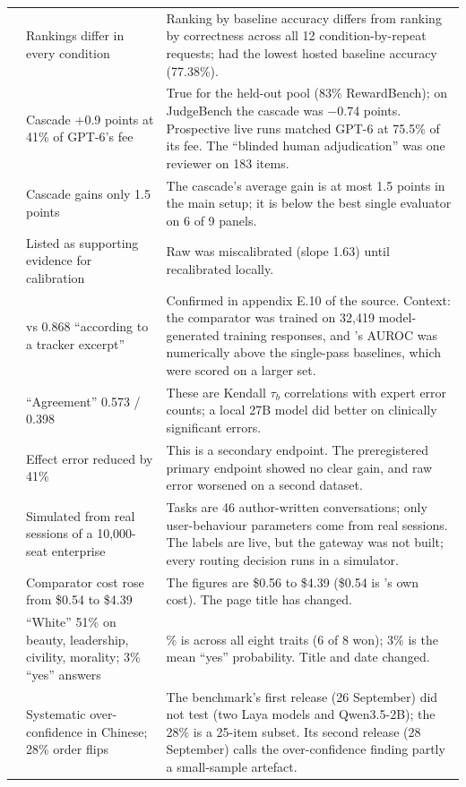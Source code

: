 {\begin{longtable}{@{}>{\raggedright\arraybackslash}p{1.5cm}>{\raggedright\arraybackslash}p{5.6cm}>{\raggedright\arraybackslash}p{8.4cm}@{}}
\cite{arx27678} & Rankings differ in every condition & Ranking by baseline accuracy differs from ranking by correctness across all 12 condition-by-repeat requests; \jev{} had the lowest hosted baseline accuracy (77.38\%). \\
\cite{arx26550} & Cascade +0.9 points at 41\% of GPT-6's fee & True for the held-out pool (83\% RewardBench); on JudgeBench the cascade was $-$0.74 points. Prospective live runs matched GPT-6 at 75.5\% of its fee. The ``blinded human adjudication'' was one reviewer on 183 items. \\
\cite{arx29769} & Cascade gains only 1.5 points & The cascade's average gain is at most 1.5 points in the main setup; it is below the best single evaluator on 6 of 9 panels. \\
\cite{arx24052} & Listed as supporting evidence for calibration & Raw \jev{} was miscalibrated (slope 1.63) until recalibrated locally. \\
\cite{arx24881} & 0.666 vs 0.868 ``according to a tracker excerpt'' & Confirmed in appendix E.10 of the source. Context: the comparator was trained on 32,419 model-generated training responses, and \jev{}'s AUROC was numerically above the single-pass baselines, which were scored on a larger set. \\
\cite{arx27607} & ``Agreement'' 0.573 / 0.398 & These are Kendall $\tau_b$ correlations with expert error counts; a local 27B model did better on clinically significant errors. \\
\cite{arx27535} & Effect error reduced by 41\% & This is a secondary endpoint. The preregistered primary endpoint showed no clear gain, and raw error worsened on a second dataset. \\
\cite{arx28919} & Simulated from real sessions of a 10,000-seat enterprise & Tasks are 46 author-written conversations; only user-behaviour parameters come from real sessions. The \jev{} labels are live, but the gateway was not built; every routing decision runs in a simulator. \\
\cite{checkpoint2026jev} & Comparator cost rose from \$0.54 to \$4.39 & The figures are \$0.56 to \$4.39 (\$0.54 is \jev{}'s own cost). The page title has changed. \\
\cite{simmons2026saidno} & ``White'' 51\% on beauty, leadership, civility, morality; 3\% ``yes'' answers & 51\% is across all eight traits (6 of 8 won); 3\% is the mean ``yes'' probability. Title and date changed. \\
\cite{qin2026zhdecisionbench} & Systematic over-confidence in Chinese; 28\% order flips & The benchmark's first release (26 September) did not test \jev{} (two Laya models and Qwen3.5-2B); the 28\% is a 25-item subset. Its second release (28 September) calls the over-confidence finding partly a small-sample artefact. \\

\end{longtable}}
